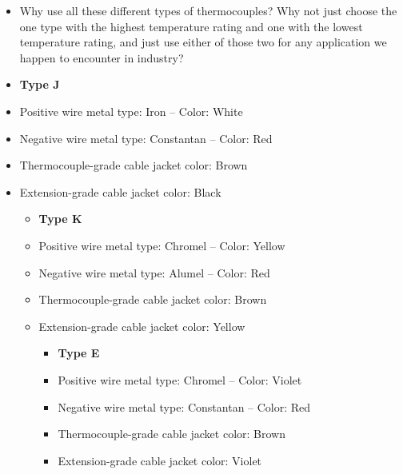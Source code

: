 \begin{itemize}
\begin{itemize}
\begin{itemize}
\begin{itemize}
\begin{itemize}
\begin{itemize}
\begin{itemize}
\item{} Why use all these different types of thermocouples?  Why not just choose the one type with the highest temperature rating and one with the lowest temperature rating, and just use either of those two for any application we happen to encounter in industry?
\end{itemize}













\begin{itemize}
\item{} {\bf Type J} 
\item{} Positive wire metal type: Iron -- Color: White 
\item{} Negative wire metal type: Constantan -- Color: Red 
\item{} Thermocouple-grade cable jacket color: Brown 
\item{} Extension-grade cable jacket color: Black 
\medskip

\vskip 10pt

\begin{itemize}
\item{} {\bf Type K} 
\item{} Positive wire metal type: Chromel -- Color: Yellow 
\item{} Negative wire metal type: Alumel -- Color: Red 
\item{} Thermocouple-grade cable jacket color: Brown 
\item{} Extension-grade cable jacket color: Yellow 
\medskip

\vskip 10pt

\begin{itemize}
\item{} {\bf Type E} 
\item{} Positive wire metal type: Chromel -- Color: Violet 
\item{} Negative wire metal type: Constantan -- Color: Red 
\item{} Thermocouple-grade cable jacket color: Brown 
\item{} Extension-grade cable jacket color: Violet 
\medskip


\end{itemize}
\end{itemize}
\end{itemize}
\end{itemize}
\end{itemize}
\end{itemize}
\end{itemize}
\end{itemize}
\end{itemize}
